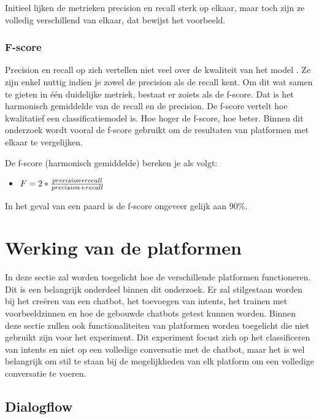 Initieel lijken de metrieken precision en recall sterk op elkaar, maar toch zijn ze volledig verschillend van elkaar, dat bewijst het voorbeeld.

\subsubsection{F-score}

Precision en recall op zich vertellen niet veel over de kwaliteit van het model \autocite{Treml2019}. Ze zijn enkel nuttig indien je zowel de precision als de recall kent. Om dit wat samen te gieten in één duidelijke metriek, bestaat er zoiets als de f-score. Dat is het harmonisch gemiddelde van de recall en de precision. De f-score vertelt hoe kwalitatief een classificatiemodel is. Hoe hoger de f-score, hoe beter. Binnen dit onderzoek wordt vooral de f-score gebruikt om de resultaten van platformen met elkaar te vergelijken.

De f-score (harmonisch gemiddelde) bereken je als volgt:
\begin{itemize}
    \item $F= 2 * \frac{precision*recall}{precision+recall}\\$
\end{itemize}

In het geval van een paard is de f-score ongeveer gelijk aan 90\%.


\section{Werking van de platformen}
\label{sec:werking-platformen}


In deze sectie zal worden toegelicht hoe de verschillende platformen functioneren. Dit is een belangrijk onderdeel binnen dit onderzoek. Er zal stilgestaan worden bij het creëren van een chatbot, het toevoegen van intents, het trainen met voorbeeldzinnen en hoe de gebouwde chatbots getest kunnen worden. Binnen deze sectie zullen ook functionaliteiten van platformen worden toegelicht die niet gebruikt zijn voor het experiment. Dit experiment focust zich op het classificeren van intents en niet op een volledige conversatie met de chatbot, maar het is wel belangrijk om stil te staan bij de mogelijkheden van elk platform om een volledige conversatie te voeren.

\subsection{Dialogflow}
\label{subsec:werking-platformen-dialogflow}

